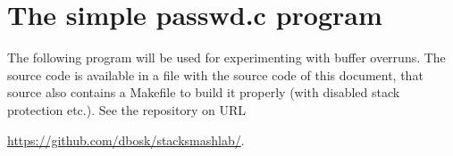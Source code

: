 \printbibliography


\appendix
\section{The simple passwd.c program}
\label{app:passwdsrc}
The following program will be used for experimenting with buffer overruns.
The source code is available in a file with the source code of this document, 
that source also contains a Makefile to build it properly (with disabled stack 
protection etc.).
See the repository on URL
\begin{center}
  \url{https://github.com/dbosk/stacksmashlab/}.
\end{center}



